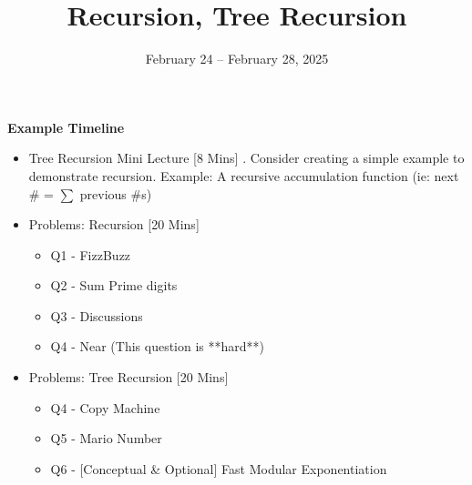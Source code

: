 \documentclass{exam}
\title{Recursion, Tree Recursion}
\date{February 24 -- February 28, 2025}
\begin{document}
\maketitle

\begin{meta}
    \textbf{Example Timeline}
    \begin{itemize}
        \item Tree Recursion Mini Lecture [8 Mins]
            . Consider creating a simple example to demonstrate recursion. Example: A recursive accumulation function (ie: next \# = $\sum$ previous \#s)
        \item Problems: Recursion [20 Mins]
        \begin{itemize}
            \item Q1 - FizzBuzz
            \item Q2 - Sum Prime digits
            \item Q3 - Discussions
            \item Q4 - Near (This question is **hard**)
        \end{itemize}
        \item Problems: Tree Recursion [20 Mins]
        \begin{itemize}
            \item Q4 - Copy Machine
            \item Q5 - Mario Number
            \item Q6 - [Conceptual \& Optional] Fast Modular Exponentiation
        \end{itemize}
        
    \end{itemize}
\end{meta}
\end{document}
